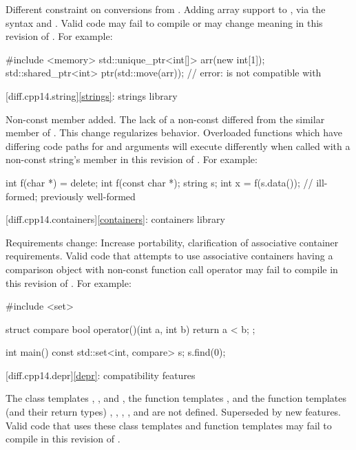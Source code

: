 \change
Different constraint on conversions from .
\rationale
Adding array support to ,
via the syntax  and .
\effect
Valid \CppXIV{} code may fail to compile or may change meaning in this
revision of \Cpp{}.
For example:
\begin{codeblock}
#include <memory>
std::unique_ptr<int[]> arr(new int[1]);
std::shared_ptr<int> ptr(std::move(arr));   // error:  is not compatible with 
\end{codeblock}

[diff.cpp14.string]{\ref{strings}: strings library}

\change
Non-const  member added.
\rationale
The lack of a non-const 
differed from the similar member of .
This change regularizes behavior.
\effect
Overloaded functions which have differing code paths
for  and  arguments
will execute differently
when called with a non-const string's  member
in this revision of \Cpp{}.
For example:
\begin{codeblock}
int f(char *) = delete;
int f(const char *);
string s;
int x = f(s.data());            // ill-formed; previously well-formed
\end{codeblock}

[diff.cpp14.containers]{\ref{containers}: containers library}

\change
Requirements change:
\rationale
Increase portability, clarification of associative container requirements.
\effect
Valid \CppXIV{} code that attempts to use associative containers
having a comparison object with non-const function call operator
may fail to compile in this revision of \Cpp{}.
For example:
\begin{codeblock}
#include <set>

struct compare
{
  bool operator()(int a, int b)
  {
    return a < b;
  }
};

int main() {
  const std::set<int, compare> s;
  s.find(0);
}
\end{codeblock}

[diff.cpp14.depr]{\ref{depr}: compatibility features}

\nodiffref
\change
The class templates
,
, and
,
the function templates
,
and the function templates (and their return types)
,
,
,
, and
are not defined.
\rationale
Superseded by new features.
\effect
Valid \CppXIV{} code that uses these class templates
and function templates may fail to compile in this revision of \Cpp{}.

